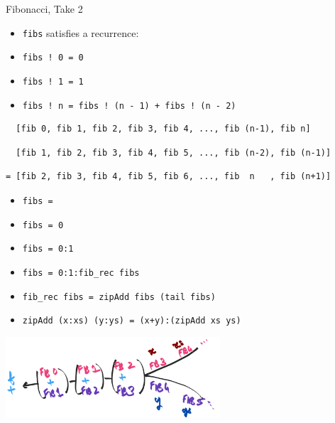\documentclass[8pt]{beamer}
\newcommand{\hs}[1]{\texttt{#1}}
\begin{document}
\begin{frame}[fragile]{Fibonacci, Take 2}
\begin{itemize}
    \item \hs{fibs} satisfies a recurrence:
    \item \hs{fibs ! 0 = 0}
    \item \hs{fibs ! 1 = 1}
    \item \hs{fibs ! n = fibs ! (n - 1) + fibs ! (n - 2)}
\end{itemize}
\pause
\begin{verbatim}
  [fib 0, fib 1, fib 2, fib 3, fib 4, ..., fib (n-1), fib n]
\end{verbatim}
\pause
\begin{verbatim}
  [fib 1, fib 2, fib 3, fib 4, fib 5, ..., fib (n-2), fib (n-1)]
\end{verbatim}
\pause
\begin{verbatim}
= [fib 2, fib 3, fib 4, fib 5, fib 6, ..., fib  n   , fib (n+1)]
\end{verbatim}
\pause

% 
\begin{itemize}
\item \hs{fibs = }\pause
\item \hs{fibs = 0}\pause
\item \hs{fibs = 0:1}\pause
\item \hs{fibs = 0:1:fib_rec fibs}\pause
\item \hs{fib_rec fibs = zipAdd fibs (tail fibs)}\pause
\item \hs{zipAdd (x:xs) (y:ys) = (x+y):(zipAdd xs ys)}\pause
\end{itemize}


\includegraphics[height=3cm]{./zipper.png}

\end{frame}
\end{document}
